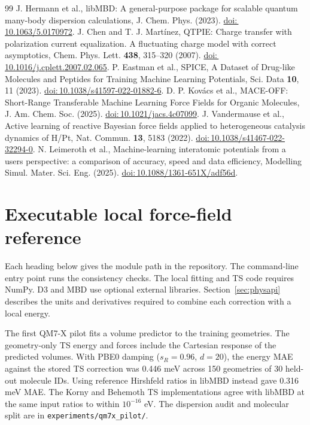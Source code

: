 \documentclass[11pt,a4paper]{article}
\newcommand{\doi}[1]{\href{https://doi.org/#1}{doi:\,#1}}\newcommand{\pg}{\clearpage}
\begin{document}
\begin{thebibliography}{99}
 J. Hermann et al., libMBD: A general-purpose package for scalable quantum many-body dispersion calculations, J. Chem. Phys. (2023). \doi{10.1063/5.0170972}.
 J. Chen and T. J. Mart\'inez, QTPIE: Charge transfer with polarization current equalization. A fluctuating charge model with correct asymptotics, Chem. Phys. Lett. \textbf{438}, 315--320 (2007). \doi{10.1016/j.cplett.2007.02.065}.
 P. Eastman et al., SPICE, A Dataset of Drug-like Molecules and Peptides for Training Machine Learning Potentials, Sci. Data \textbf{10}, 11 (2023). \doi{10.1038/s41597-022-01882-6}.
 D. P. Kov\'acs et al., MACE-OFF: Short-Range Transferable Machine Learning Force Fields for Organic Molecules, J. Am. Chem. Soc. (2025). \doi{10.1021/jacs.4c07099}.
 J. Vandermause et al., Active learning of reactive Bayesian force fields applied to heterogeneous catalysis dynamics of H/Pt, Nat. Commun. \textbf{13}, 5183 (2022). \doi{10.1038/s41467-022-32294-0}.
 N. Leimeroth et al., Machine-learning interatomic potentials from a users perspective: a comparison of accuracy, speed and data efficiency, Modelling Simul. Mater. Sci. Eng. (2025). \doi{10.1088/1361-651X/adf56d}.
\end{thebibliography}\endgroup


\pg\appendix\section{Executable local force-field reference}\label{app:code}
Each heading below gives the module path in the repository. The command-line entry point runs the consistency checks. The local fitting and TS code requires NumPy. D3 and MBD use optional external libraries. Section~\ref{sec:physapi} describes the units and derivatives required to combine each correction with a local energy.

The first QM7-X pilot fits a volume predictor to the training geometries. The geometry-only TS energy and forces include the Cartesian response of the predicted volumes. With PBE0 damping ($s_R=0.96$, $d=20$), the energy MAE against the stored TS correction was 0.446 meV across 150 geometries of 30 held-out molecule IDs. Using reference Hirshfeld ratios in libMBD instead gave 0.316 meV MAE. The Korny and Behemoth TS implementations agree with libMBD at the same input ratios to within $10^{-16}$ eV. The dispersion audit and molecular split are in \texttt{experiments/qm7x\_pilot/}.
\end{document}
